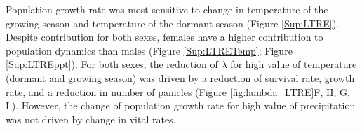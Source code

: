 \documentclass[12pt]{article}\usepackage[]{graphicx}\usepackage[dvipsnames]{xcolor}
\begin{document}
Population growth rate was most sensitive to change in temperature of the growing season and temperature of the dormant season (Figure \ref{Sup:LTRE}).
Despite contribution for both sexes, females have a higher contribution to population dynamics than males (Figure \ref{Sup:LTRETemp}; Figure \ref{Sup:LTREppt}).
For both sexes, the reduction of $\lambda$ for high value of temperature  (dormant and growing season) was driven by a reduction of survival rate, growth rate, and a reduction in number of panicles (Figure \ref{fig:lambda_LTRE}F, H, G, L).
However, the change of population growth rate for high value of precipitation was not driven by change in vital rates.
\end{document}
